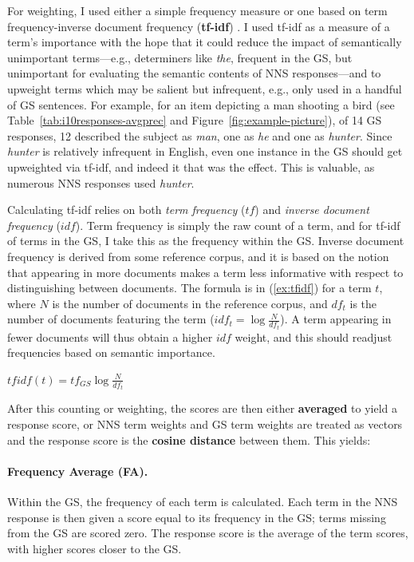 For weighting, I used either a simple frequency measure
or one based on term frequency-inverse document frequency (\textbf{tf-idf})
\citep[][ch. 6]{manning-et-al:08}.  I used tf-idf as a measure of
a term's importance with the hope that it could reduce the impact
of semantically unimportant terms---e.g., determiners like
\textit{the}, frequent in the GS, but unimportant for evaluating the
semantic contents of NNS responses---and to upweight terms which may
be salient but infrequent, e.g., only used in a handful of GS
sentences. For example, for an item depicting a man shooting a bird
(see Table~\ref{tab:i10responses-avgprec} and Figure~\ref{fig:example-picture}), of 14 GS responses, 12
described the subject as \textit{man}, one as \textit{he} and one as
\textit{hunter}. Since \textit{hunter} is relatively infrequent in English, even
one instance in the GS should get upweighted via tf-idf, and indeed it
that was the effect. 
This is valuable, as numerous NNS responses used \textit{hunter}.

Calculating tf-idf relies on both \emph{term frequency} ($tf$) and
\emph{inverse document frequency} ($idf$).  Term frequency is simply
the raw count of a term, and for tf-idf of terms in the GS, I take
this as the frequency within the GS.  Inverse document frequency is
derived from some reference corpus, and it is based on the notion that
appearing in more documents makes a term less informative with respect
to distinguishing between documents.  The formula is in
(\ref{ex:tfidf}) for a term $t$, where $N$ is the number of documents
in the reference corpus, and $df_{t}$ is the number of documents
featuring the term ($idf_{t} = \log \frac{N}{df_{t}}$).  A term
appearing in fewer documents will thus obtain a higher $idf$ weight,
and this should readjust frequencies based on semantic importance.

\begin{exe}
\ex\label{ex:tfidf} $tfidf(t) = tf_{GS} \log \frac{N}{df_{t}}$
\end{exe}

After this counting or weighting, the scores are then either
\textbf{averaged} to yield a response score, or NNS term
weights and GS term weights are treated as vectors and the response
score is the \textbf{cosine distance} between them.  This
yields:

\paragraph{Frequency Average (FA).} 
Within the GS, the frequency of each term is calculated. Each term in
the NNS response is then given a score equal to its frequency in the
GS; terms missing from the GS are scored zero. The response score is
the average of the term scores, with higher scores closer to the GS.

